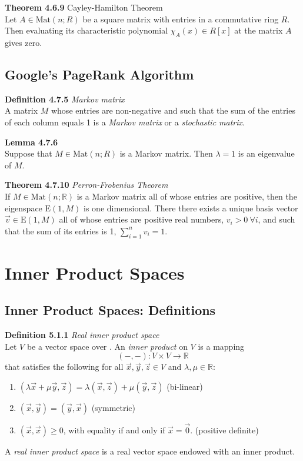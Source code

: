 \documentclass[8pt,landscape]{article}
\begin{document}
\begin{multicols}{3}
    \textbf{Theorem 4.6.9} Cayley-Hamilton Theorem \\
    Let $A \in \mathrm{Mat}(n; R)$ be a square matrix with entries in a commutative ring
    $R$.
    Then evaluating its characteristic polynomial $\chi_A(x) \in R[x]$ at the matrix $A$
    gives zero.

    \subsection{Google's PageRank Algorithm}

    \textbf{Definition 4.7.5} \emph{Markov matrix} \\
    A matrix $M$ whose entries are non-negative and such that the sum of the entries of
    each column equals 1 is a \emph{Markov matrix} or a \emph{stochastic matrix}.

    \textbf{Lemma 4.7.6} \\
    Suppose that $M \in \mathrm{Mat}(n; R)$ is a Markov matrix.
    Then $\lambda = 1$ is an eigenvalue of $M$.

    \textbf{Theorem 4.7.10} \emph{Perron-Frobenius Theorem} \\
    If $M \in \mathrm{Mat}(n; \mathbb{R})$ is a Markov matrix all of whose entries are
    positive, then the eigenspace $\mathrm{E}(1, M)$ is one dimensional.
    There there exists a unique basis vector $\vec{v} \in \mathrm{E}(1, M)$
    all of whose entries are positive real numbers, $v_i > 0 \ \forall i$,
    and such that the sum of its entries is 1,
    $\sum_{i=1}^n v_i = 1$.

    \section{Inner Product Spaces}

    \subsection{Inner Product Spaces: Definitions}

    \textbf{Definition 5.1.1} \emph{Real inner product space} \\
    Let $V$ be a vector space over .
    An \emph{inner product} on $V$ is a mapping
    \[
        (-, -) : V \times V \to \mathbb{R}
    \]
    that satisfies the following for all $\vec{x}, \vec{y}, \vec{z} \in V$
    and $\lambda, \mu \in \mathbb{R}$:
    \begin{enumerate}
        \item $(\lambda \vec{x} + \mu \vec{y}, \vec{z}) =
            \lambda(\vec{x}, \vec{z}) + \mu(\vec{y}, \vec{z})$
            \quad (bi-linear)
        \item $(\vec{x}, \vec{y}) = (\vec{y}, \vec{x})$
            \quad (symmetric)
        \item $(\vec{x}, \vec{x}) \geq 0$,
            with equality if and only if $\vec{x} = \vec{0}$.
            \quad (positive definite)
    \end{enumerate}
    A \emph{real inner product space} is a real vector space endowed with an inner product.


\end{multicols}
\end{document}
